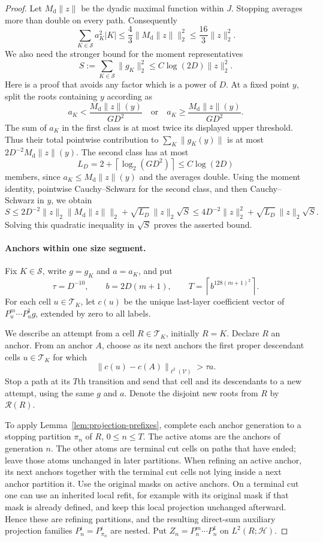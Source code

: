 \begin{proof}
Let $M_{\mathrm d}\|z\|$ be the dyadic maximal function within $J$.
Stopping averages more than double on every path.  Consequently
\[
 \sum_{K\in\mathcal S}a_K^2|K|
    \le\frac43\|M_{\mathrm d}\|z\|\|_2^2
    \le\frac{16}{3}\|z\|_2^2.
\]
We also need the stronger bound for the moment representatives
\[
 S:=\sum_{K\in\mathcal S}\|g_K\|_2^2
       \le C\log(2D)\|z\|_2^2.
\]
Here is a proof that avoids any factor which is a power of $D$.  At a fixed
point $y$, split the roots containing $y$ according as
\[
 a_K<\frac{M_{\mathrm d}\|z\|(y)}{GD^2}
 \quad\text{or}\quad
 a_K\ge\frac{M_{\mathrm d}\|z\|(y)}{GD^2}.
\]
The sum of $a_K$ in the first class is at most twice its displayed upper
threshold.  Thus their total pointwise contribution to
$\sum_K\|g_K(y)\|$ is at most $2D^{-2}M_{\mathrm d}\|z\|(y)$.  The second
class has at most
\[
 L_D=2+\left\lceil\log_2(GD^2)\right\rceil\le C\log(2D)
\]
members, since $a_K\le M_{\mathrm d}\|z\|(y)$ and the averages double.
Using the moment identity, pointwise Cauchy--Schwarz for the second class,
and then Cauchy--Schwarz in $y$, we obtain
\[
 S\le 2D^{-2}\|z\|_2\|M_{\mathrm d}\|z\|\|_2
          +\sqrt{L_D}\,\|z\|_2\sqrt S
   \le4D^{-2}\|z\|_2^2+\sqrt{L_D}\,\|z\|_2\sqrt S.
\]
Solving this quadratic inequality in $\sqrt S$ proves the asserted bound.

\paragraph{Anchors within one size segment.}
Fix $K\in\mathcal S$, write $g=g_K$ and $a=a_K$, and put
\[
 \tau=D^{-10},\qquad
 b=2D(m+1),\qquad
 T=\left\lceil b^{128(m+1)^2}\right\rceil.
\]
For each cell $u\in\mathcal T_K$, let $c(u)$ be the unique last-layer
coefficient vector of $P_u^m\cdots P_u^1g$, extended by zero to all labels.

We describe an attempt from a cell $R\in\mathcal T_K$, initially $R=K$.
Declare $R$ an anchor.  From an anchor $A$, choose as its next anchors the
first proper descendant cells $u\in\mathcal T_K$ for which
\[
 \|c(u)-c(A)\|_{\ell^2(\mathcal V)}>\tau a.
\]
Stop a path at its $T$th transition and send that cell and its descendants
to a new attempt, using the same $g$ and $a$.  Denote the disjoint new roots
from $R$ by $\mathcal R(R)$.

To apply Lemma~\ref{lem:projection-prefixes}, complete each anchor generation
to a stopping partition $\pi_n$ of $R$, $0\le n\le T$.  The active atoms are
the anchors of generation $n$.  The other atoms are terminal cut cells on
paths that have ended; leave those atoms unchanged in later partitions.
When refining an active anchor, its next anchors together with the terminal
cut cells not lying inside a next anchor partition it.  Use the original
masks on active anchors.  On a terminal cut one can use an inherited local
refit, for example with its original mask if that mask is already defined,
and keep this local projection unchanged afterward.  Hence these are
refining partitions, and the resulting direct-sum auxiliary projection
families $P_n^i=P_{\pi_n}^i$ are nested.  Put
$Z_n=P_n^m\cdots P_n^1$ on $L^2(R;\mathcal H)$.


\end{proof}
